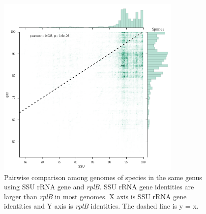 \documentclass[]{msu-thesis}
\begin{document}
\begin{figure}[tbph!]
  \centering
  \includegraphics[width=0.80\textwidth]{figs/inter_species_comp}
  \caption[Pairwise comparison among genomes in the same genus using SSU rRNA gene and \textit{rplB}]{Pairwise comparison among genomes of species in the same genus using SSU rRNA gene and \textit{rplB}. SSU rRNA gene identities are larger than \textit{rplB} in most genomes. X axis is SSU rRNA gene identities and Y axis is \textit{rplB} identities. The dashed line is y = x.}
  \label{fig:interSpeciesComp}
\end{figure}
\end{document}
